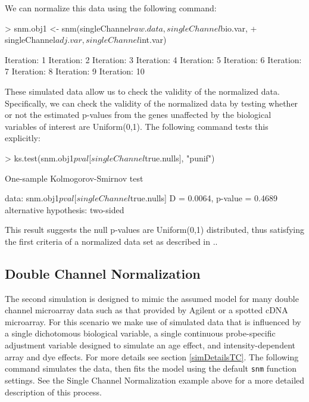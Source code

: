 \documentclass[11pt]{article}
\begin{document}
We can normalize this data using the following command:

\begin{Schunk}
\begin{Sinput}
> snm.obj1 <- snm(singleChannel$raw.data, singleChannel$bio.var, 
+     singleChannel$adj.var, singleChannel$int.var)
\end{Sinput}
\begin{Soutput}
 Iteration:  1
 Iteration:  2
 Iteration:  3
 Iteration:  4
 Iteration:  5
 Iteration:  6
 Iteration:  7
 Iteration:  8
 Iteration:  9
 Iteration:  10
\end{Soutput}
\end{Schunk}

These simulated data allow us to check the validity of the normalized  data.  Specifically, we can check the validity of the normalized data by testing whether or not the estimated p-values from the genes  unaffected by the biological variables of interest are Uniform(0,1).  The following command tests this explicitly:

\begin{Schunk}
\begin{Sinput}
> ks.test(snm.obj1$pval[singleChannel$true.nulls], "punif")
\end{Sinput}
\begin{Soutput}
	One-sample Kolmogorov-Smirnov test

data:  snm.obj1$pval[singleChannel$true.nulls] 
D = 0.0064, p-value = 0.4689
alternative hypothesis: two-sided 
\end{Soutput}
\end{Schunk}

This result suggests the null p-values are Uniform(0,1) distributed, thus satisfying the first criteria of a normalized
data set as described in \cite{mecham2010}..   

\subsection{Double Channel Normalization}\label{egDC}
The second simulation is designed to mimic the assumed model for many double channel microarray data such as that provided by Agilent or a spotted cDNA microarray.
For this scenario we make use of simulated data that is influenced by a single dichotomous biological variable, a single continuous probe-specific adjustment variable designed to simulate an age effect, and intensity-dependent array and dye effects.  For more details see section \ref{simDetailsTC}. The following command simulates the data, then fits the model using the default \texttt{snm} function settings.  See the Single Channel Normalization example above for a more detailed description of this process.  
\end{document}
